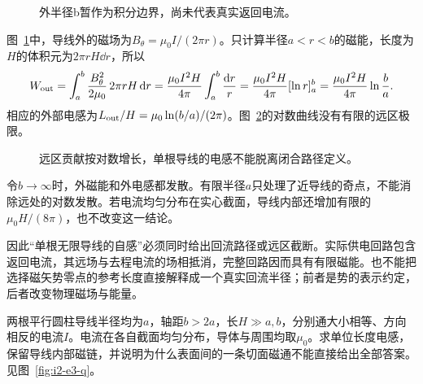 \begin{figure}[H]\centering
{}
\caption{外半径b暂作为积分边界，尚未代表真实返回电流。}\label{fig:i2-e2-q}
\end{figure}
\begin{solution}
图~\ref{fig:i2-e2-q}中，导线外的磁场为$B_\theta=\mu_0I/(2\pi r)$。只计算半径$a<r<b$的磁能，长度为$H$的体积元为$2\pi rH\dd r$，所以
\[W_{\rm out}=\int_a^b\frac{B_\theta^2}{2\mu_0}\,2\pi rH\mathop{}\!\mathrm d r
=\frac{\mu_0I^2H}{4\pi}\int_a^b\frac{\mathop{}\!\mathrm d r}r
=\frac{\mu_0I^2H}{4\pi}[\ln r]_a^b
=\frac{\mu_0I^2H}{4\pi}\ln\frac ba.
\]
相应的外部电感为$L_{\rm out}/H=\mu_0\ln(b/a)/(2\pi)$。图~\ref{fig:i2-e2-s}的对数曲线没有有限的远区极限。


\begin{figure}[H]\centering
{}
\caption{远区贡献按对数增长，单根导线的电感不能脱离闭合路径定义。}\label{fig:i2-e2-s}
\end{figure}

令$b\to\infty$时，外磁能和外电感都发散。有限半径$a$只处理了近导线的奇点，不能消除远处的对数发散。若电流均匀分布在实心截面，导线内部还增加有限的$\mu_0H/(8\pi)$，也不改变这一结论。

因此“单根无限导线的自感”必须同时给出回流路径或远区截断。实际供电回路包含返回电流，其远场与去程电流的场相抵消，完整回路因而具有有限磁能。也不能把选择磁矢势零点的参考长度直接解释成一个真实回流半径；前者是势的表示约定，后者改变物理磁场与能量。
\end{solution}

\begin{example}[有限截面双线回路的完整磁链]\label{ex:i2-e3}
两根平行圆柱导线半径均为$a$，轴距$b>2a$，长$H\gg a,b$，分别通大小相等、方向相反的电流$I$。电流在各自截面均匀分布，导体与周围均取$\mu_0$。求单位长度电感，保留导线内部磁链，并说明为什么表面间的一条切面磁通不能直接给出全部答案。 见图~\ref{fig:i2-e3-q}。
\end{example}

